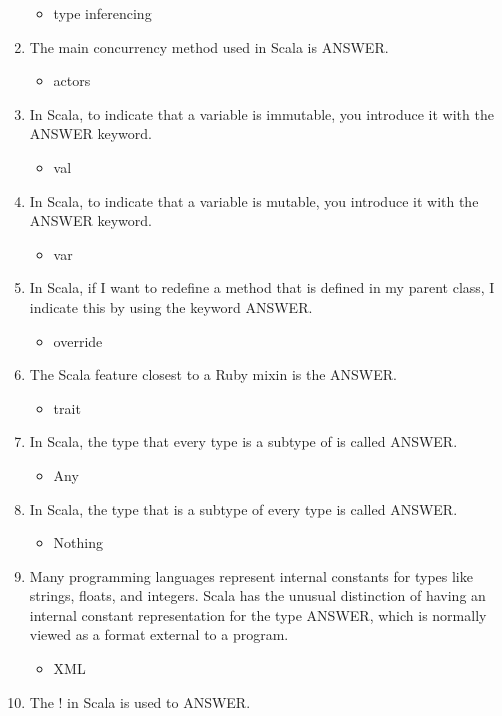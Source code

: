 \documentclass{exam}
\begin{document}
\begin{enumerate}
\begin{itemize}
\item type inferencing
\end{itemize}
\item The main concurrency method used in Scala is ANSWER.
\begin{itemize}
\item actors
\end{itemize}
\item In Scala, to indicate that a variable is immutable, you introduce it with the ANSWER keyword.
\begin{itemize}
\item val
\end{itemize}
\item In Scala, to indicate that a variable is mutable, you introduce it with the ANSWER keyword.
\begin{itemize}
\item var
\end{itemize}
\item In Scala, if I want to redefine a method that is defined in my parent class, I indicate this by using the keyword ANSWER.
\begin{itemize}
\item override
\end{itemize}
\item The Scala feature closest to a Ruby mixin is the ANSWER.
\begin{itemize}
\item trait
\end{itemize}
\item In Scala, the type that every type is a subtype of is called ANSWER.
\begin{itemize}
\item Any
\end{itemize}
\item In Scala, the type that is a subtype of every type is called ANSWER.
\begin{itemize}
\item Nothing
\end{itemize}
\item Many programming languages represent internal constants for types like strings, floats, and integers.  Scala has the unusual distinction of having an internal constant representation for the type ANSWER, which is normally viewed as a format external to a program.
\begin{itemize}
\item XML
\end{itemize}
\item The ! in Scala is used to ANSWER.

\end{enumerate}
\end{document}
